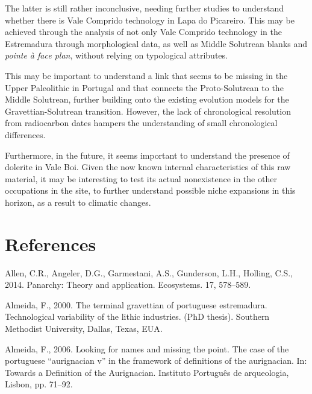 \documentclass[12pt,twoside]{reedthesis}
\begin{document}
The latter is still rather inconclusive, needing further studies to understand whether there is Vale Comprido technology in Lapa do Picareiro. This may be achieved through the analysis of not only Vale Comprido technology in the Estremadura through morphological data, as well as Middle Solutrean blanks and \emph{pointe à face plan}, without relying on typological attributes.

This may be important to understand a link that seems to be missing in the Upper Paleolithic in Portugal and that connects the Proto-Solutrean to the Middle Solutrean, further building onto the existing evolution models for the Gravettian-Solutrean transition. However, the lack of chronological resolution from radiocarbon dates hampers the understanding of small chronological differences.

Furthermore, in the future, it seems important to understand the presence of dolerite in Vale Boi. Given the now known internal characteristics of this raw material, it may be interesting to test its actual nonexistence in the other occupations in the site, to further understand possible niche expansions in this horizon, as a result to climatic changes.

\hypertarget{references}{%
\chapter*{References}\label{references}}


\noindent
\singlespacing

\setlength{\parindent}{-0.20in}
\setlength{\leftskip}{0.20in}
\setlength{\parskip}{8pt}

\hypertarget{refs}{}
\leavevmode\hypertarget{ref-allen2014}{}%
Allen, C.R., Angeler, D.G., Garmestani, A.S., Gunderson, L.H., Holling, C.S., 2014. Panarchy: Theory and application. Ecosystems. 17, 578--589.

\leavevmode\hypertarget{ref-almeida2000}{}%
Almeida, F., 2000. The terminal gravettian of portuguese estremadura. Technological variability of the lithic industries. (PhD thesis). Southern Methodist University, Dallas, Texas, EUA.

\leavevmode\hypertarget{ref-almeida2006}{}%
Almeida, F., 2006. Looking for names and missing the point. The case of the portuguese ``aurignacian v'' in the framework of definitions of the aurignacian. In: Towards a Definition of the Aurignacian. Instituto Português de arqueologia, Lisbon, pp. 71--92.
\end{document}
